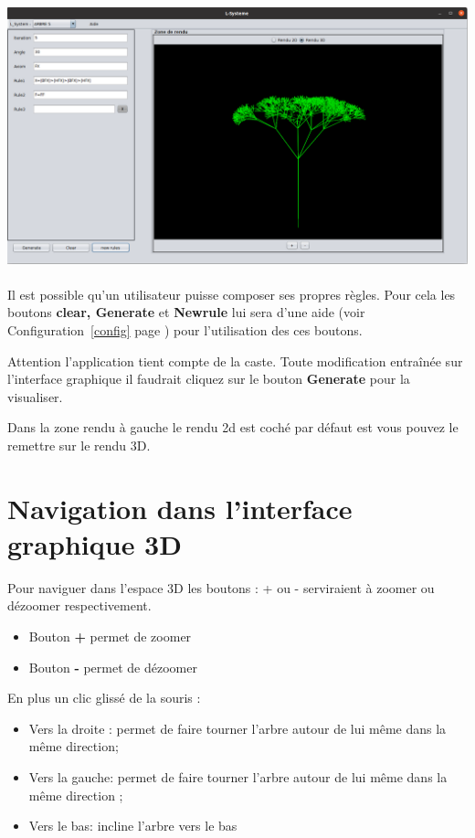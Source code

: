 \includegraphics[width=16cm]{images/interface.png}
\\
\\
Il est possible qu'un utilisateur puisse composer ses  propres règles. Pour cela les boutons \textbf{ clear, Generate} et \textbf{Newrule} lui sera d'une aide (voir Configuration~\ref{config} page \pageref{config}) pour l'utilisation des ces boutons.

Attention  l'application tient compte de la caste. Toute modification entraînée sur l'interface graphique il faudrait cliquez sur le bouton \textbf{Generate} pour la visualiser.

Dans la zone rendu  à gauche le rendu 2d est coché par défaut est vous pouvez le remettre sur le rendu 3D. 

\section{Navigation dans l'interface graphique 3D}

Pour naviguer dans l'espace 3D les boutons : + ou - serviraient à zoomer  ou dézoomer respectivement.
\\
\begin{itemize}
	\item Bouton \textbf{+} permet de zoomer
	\item Bouton \textbf{-}  permet de dézoomer 
\end{itemize}

En plus un clic glissé de la souris :
\begin{itemize}
	\item Vers la droite : permet de faire tourner l'arbre autour de lui même dans la même direction;
	\item Vers la gauche: permet de faire tourner l'arbre  autour de lui même dans la même direction ;
	\item Vers le bas: incline l'arbre vers le bas 
\end{itemize}
\newpage
